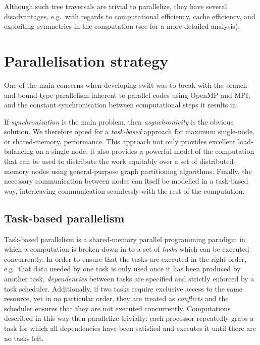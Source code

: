 \documentclass{sig-alternate-05-2015}
\newcommand{\swift}{{\sc swift}\xspace}
\begin{document}
Although such tree traversals are trivial to parallelize, they
have several disadvantages, e.g.~with regards to computational
efficiency, cache efficiency, and exploiting symmetries in the
computation (see \cite{gonnet2015efficient} for a more detailed
analysis).



\section{Parallelisation strategy}

One of the main concerns when developing \swift was to break
with the branch-and-bound type parallelism inherent to parallel
codes using OpenMP and MPI, and the constant synchronisation
between computational steps it results in.

If {\em synchronisation} is the main problem, then {\em
  asynchronicity} is the obvious solution.  We therefore opted for a
{\em task-based} approach for maximum single-node, or shared-memory,
performance.  This approach not only provides excellent load-balancing
on a single node, it also provides a powerful model of the computation
that can be used to distribute the work equitably over a set of
distributed-memory nodes using general-purpose graph partitioning
algorithms.  Finally, the necessary communication between nodes can
itself be modelled in a task-based way, interleaving communication
seamlessly with the rest of the computation.


\subsection{Task-based parallelism}

Task-based parallelism is a shared-memory parallel programming
paradigm in which a computation is broken-down in to a set of
{\em tasks} which can be executed  concurrently.
In order to ensure that the tasks are executed in the right
order, e.g.~that data needed by one task is only used once it
has been produced by another task, {\em dependencies} between
tasks are specified and strictly enforced by a task scheduler.
Additionally, if two tasks require exclusive access to the same
resource, yet in no particular order, they are treated as
{\em conflicts} and the scheduler ensures that they are not executed
concurrently.
Computations described in this way then parallelize trivially:
each processor repeatedly grabs a task for which all dependencies
have been satisfied and executes it until there are no tasks left.
\end{document}
